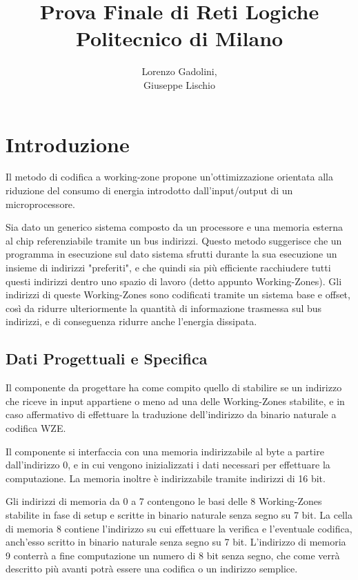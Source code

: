 \documentclass{article}
\title{Prova Finale di Reti Logiche\\ \large Politecnico di Milano}
\author{Lorenzo Gadolini, \\ Giuseppe Lischio}
\begin{document}
\maketitle


\tableofcontents


\newpage
{}




\setcounter{page}{1}


\section{Introduzione}

Il metodo di codifica a working-zone propone un'ottimizzazione orientata alla riduzione del consumo di energia introdotto dall'input/output di un microprocessore. 

Sia dato un generico sistema composto da un processore e una memoria esterna al chip referenziabile tramite un bus indirizzi. Questo metodo suggerisce che un programma in esecuzione sul dato sistema sfrutti durante la sua esecuzione un insieme di indirizzi "preferiti", e che quindi sia più efficiente racchiudere tutti questi indirizzi dentro uno spazio di lavoro (detto appunto Working-Zones). Gli indirizzi di queste Working-Zones sono codificati tramite un sistema base e offset, così da ridurre ulteriormente la quantità di informazione trasmessa sul bus indirizzi, e di conseguenza ridurre anche l'energia dissipata.

\subsection{Dati Progettuali e Specifica}

Il componente da progettare ha come compito quello di stabilire se un indirizzo che riceve in input appartiene o meno ad una delle Working-Zones stabilite, e in caso affermativo di effettuare la traduzione dell'indirizzo da binario naturale a codifica WZE.

Il componente si interfaccia con una memoria indirizzabile al byte a partire dall'indirizzo 0, e in cui vengono inizializzati i dati necessari per effettuare la computazione. La memoria inoltre è indirizzabile tramite indirizzi di 16 bit.

Gli indirizzi di memoria da 0 a 7 contengono le basi delle 8 Working-Zones stabilite in fase di setup e scritte in binario naturale senza segno su 7 bit.
La cella di memoria 8 contiene l'indirizzo su cui effettuare la verifica e l'eventuale codifica, anch'esso scritto in binario naturale senza segno su 7 bit.
L'indirizzo di memoria 9 conterrà a fine computazione un numero di 8 bit senza segno, che come verrà descritto più avanti potrà essere una codifica o un indirizzo semplice.
\end{document}
